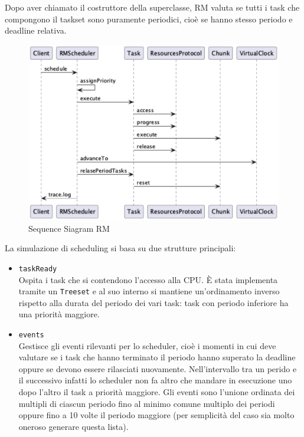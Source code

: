 Dopo aver chiamato il costruttore della superclasse, RM valuta se tutti i task che compongono il taskset sono puramente periodici, cioè se hanno stesso periodo e deadline relativa.

\begin{figure}[htbp]
    \centering
    \includegraphics[width=1\textwidth]{immagini/sequence diagram RM.pdf}
    \caption{Sequence Siagram RM}
    \label{fig:sdRM}
\end{figure}

\myskip

La simulazione di scheduling si basa su due strutture principali:
\begin{itemize}
    \item \texttt{taskReady} \\
        Ospita i task che si contendono l'accesso alla CPU. È stata implementa tramite un \texttt{Treeset} e al suo interno si mantiene un'ordinamento inverso rispetto alla durata del periodo dei vari task: task con periodo inferiore ha una priorità maggiore.
    \item \texttt{events} \\
        Gestisce gli eventi rilevanti per lo scheduler, cioè i momenti in cui deve valutare se i task che hanno terminato il periodo hanno superato la deadline oppure se devono essere rilasciati nuovamente. Nell'intervallo tra un perido e il successivo infatti lo scheduler non fa altro che mandare in esecuzione uno dopo l'altro il task a priorità maggiore. Gli eventi sono l’unione ordinata dei multipli di ciascun periodo fino al minimo comune multiplo dei periodi oppure fino a 10 volte il periodo maggiore (per semplicità del caso sia molto oneroso generare questa lista).
\end{itemize}

